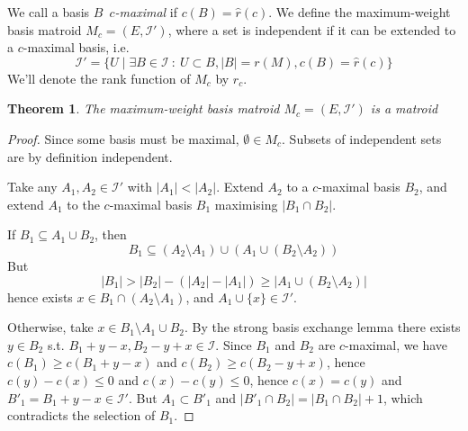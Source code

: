 \documentclass{article}
\newtheorem{theorem}{Theorem}[section]
\begin{document}
We call a basis $B$ \textit{$c$-maximal} if $c(B) = \hat{r}(c)$. We define the maximum-weight basis matroid $M_{c} = (E, \mathcal{I}')$,
where a set is independent if it can be extended to a $c$-maximal basis, i.e.
\begin{equation*}
\mathcal{I}' = \{U \mid \exists B \in \mathcal{I}\ :\ U \subset B, |B| = r(M), c(B) = \hat{r}(c)\}
\end{equation*}
We'll denote the rank function of $M_{c}$ by $r_{c}$.
\begin{theorem}
The maximum-weight basis matroid $M_{c} = (E, \mathcal{I}')$ is a matroid
\end{theorem}
\begin{proof}
Since some basis must be maximal, $\emptyset \in M_{c}$. Subsets of independent sets are by definition independent. 

Take any $A_{1}, A_{2} \in \mathcal{I}'$ with $|A_{1}| < |A_{2}|$. Extend $A_{2}$ to a $c$-maximal basis $B_{2}$, and
extend $A_{1}$ to the $c$-maximal basis $B_{1}$ maximising $|B_{1} \cap B_{2}|$.

If $B_{1} \subseteq A_{1} \cup B_{2}$, then
\begin{equation*}
B_{1} \subseteq (A_{2} \setminus A_{1}) \cup (A_{1} \cup (B_{2} \setminus A_{2}))
\end{equation*}
But
\begin{equation*}
|B_{1}| > |B_{2}| - (|A_{2}| - |A_{1}|) \geq |A_{1} \cup (B_{2} \setminus A_{2})|
\end{equation*}
hence exists $x \in B_{1} \cap (A_{2} \setminus A_{1})$, and $A_{1} \cup \{x\} \in \mathcal{I}'$.

Otherwise, take $x \in B_{1} \setminus A_{1} \cup B_{2}$. By the strong basis exchange lemma there exists $y \in B_{2}$
s.t. $B_{1} + y - x, B_{2} - y + x \in \mathcal{I}$. Since $B_{1}$ and $B_{2}$ are $c$-maximal, we have $c(B_{1}) \geq c(B_{1} + y - x)$ and
$c(B_{2}) \geq c(B_{2} - y + x)$, hence $c(y) - c(x) \leq 0$ and $c(x) - c(y) \leq 0$, hence $c(x) = c(y)$ and $B'_{1} = B_{1} + y - x \in \mathcal{I}'$.
But $A_{1} \subset B'_{1}$ and $|B'_{1} \cap B_{2}| = |B_{1} \cap B_{2}| + 1$, which contradicts the selection of $B_{1}$.
\end{proof}
\end{document}
